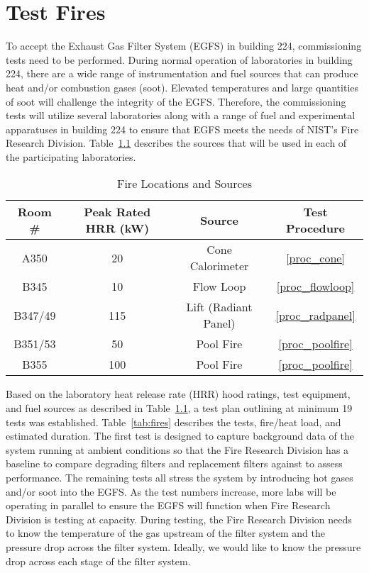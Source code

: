 \documentclass[12pt,oneside]{book}
\begin{document}
\chapter{Test Fires}
\label{test_fires}
To accept the Exhaust Gas Filter System (EGFS) in building 224, commissioning tests need to be performed.  During normal operation of laboratories in building 224, there are a wide range of instrumentation and fuel sources that can produce heat and/or combustion gases (soot). Elevated temperatures and large quantities of soot will challenge the integrity of the EGFS. Therefore, the commissioning tests will utilize several laboratories along with a range of fuel and experimental apparatuses in building 224 to ensure that EGFS meets the needs of NIST's Fire Research Division. Table~\ref{tab:sources} describes the sources that will be used in each of the participating laboratories.

\begin{table}[!h]
\centering
\caption{Fire Locations and Sources}
\label{tab:sources}
\begin{tabular}{cccc}
\toprule[1.5pt]
Room \# & Peak Rated HRR (kW) & Source & Test Procedure  \\
\midrule
A350     & 20   & Cone Calorimeter     & \ref{proc_cone}  \\
B345     & 10   & Flow Loop            & \ref{proc_flowloop}  \\
B347/49  & 115  & Lift (Radiant Panel) & \ref{proc_radpanel} \\
B351/53  & 50   & Pool Fire            & \ref{proc_poolfire} \\
B355     & 100  & Pool Fire            & \ref{proc_poolfire} \\
\bottomrule[1.25pt]
\end{tabular}\par
\end{table}

Based on the laboratory heat release rate (HRR) hood ratings, test equipment, and fuel sources as described in Table~\ref{tab:sources}, a test plan outlining at minimum 19 tests was established. Table~\ref{tab:fires} describes the tests, fire/heat load, and estimated duration. The first test is designed to capture background data of the system running at ambient conditions so that the Fire Research Division has a baseline to compare degrading filters and replacement filters against to assess performance. The remaining tests all stress the system by introducing hot gases and/or soot into the EGFS. As the test numbers increase, more labs will be operating in parallel to ensure the EGFS will function when Fire Research Division is testing at capacity. During testing, the Fire Research Division needs to know the temperature of the gas upstream of the filter system and the pressure drop across the filter system. Ideally, we would like to know the pressure drop across each stage of the filter system.
\end{document}
